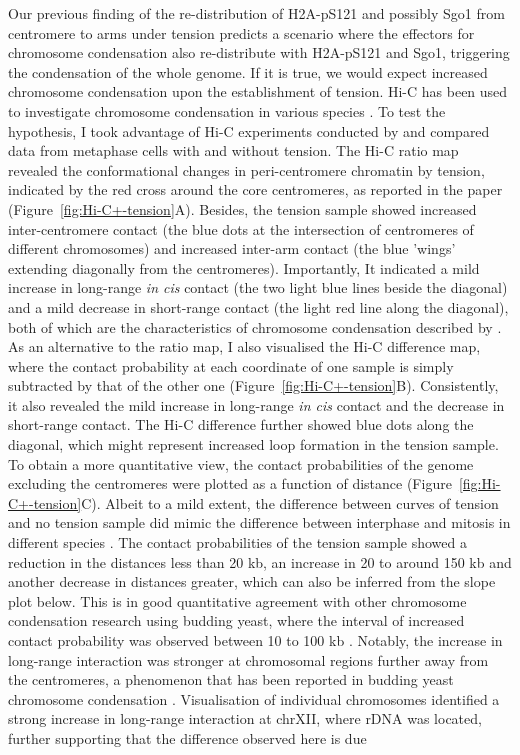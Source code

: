 Our previous finding of the re-distribution of H2A-pS121 and possibly Sgo1 from centromere to arms under tension predicts a scenario where the effectors for chromosome condensation also re-distribute with H2A-pS121 and Sgo1, triggering the condensation of the whole genome. If it is true, we would expect increased chromosome condensation upon the establishment of tension. Hi-C has been used to investigate chromosome condensation in various species \citep{Kakui2017Condensin-mediatedYeast, Schalbetter2017SMCContext, Lazar-Stefanita2017CohesinsCellcycle, Naumova2013OrganizationChromosome}. To test the hypothesis, I took advantage of Hi-C experiments conducted by \cite{Paldi2020ConvergentPericentromeres} and compared data from metaphase cells with and without tension. The Hi-C ratio map revealed the conformational changes in peri-centromere chromatin by tension, indicated by the red cross around the core centromeres, as reported in the paper (Figure~\ref{fig:Hi-C+-tension}A). Besides, the tension sample showed increased inter-centromere contact (the blue dots at the intersection of centromeres of different chromosomes) and increased inter-arm contact (the blue 'wings' extending diagonally from the centromeres). Importantly, It indicated a mild increase in long-range \textit{in cis} contact (the two light blue lines beside the diagonal) and a mild decrease in short-range contact (the light red line along the diagonal), both of which are the characteristics of chromosome condensation described by \cite{Kakui2018SMCLandscape}. As an alternative to the ratio map, I also visualised the Hi-C difference map, where the contact probability at each coordinate of one sample is simply subtracted by that of the other one (Figure~\ref{fig:Hi-C+-tension}B). Consistently, it also revealed the mild increase in long-range \textit{in cis} contact and the decrease in short-range contact. The Hi-C difference further showed blue dots along the diagonal, which might represent increased loop formation in the tension sample. To obtain a more quantitative view, the contact probabilities of the genome excluding the centromeres were plotted as a function of distance (Figure~\ref{fig:Hi-C+-tension}C). Albeit to a mild extent, the difference between curves of tension and no tension sample did mimic the difference between interphase and mitosis in different species \citep{Kakui2018SMCLandscape}. The contact probabilities of the tension sample showed a reduction in the distances less than 20 kb, an increase in 20 to around 150 kb and another decrease in distances greater, which can also be inferred from the slope plot below. This is in good quantitative agreement with other chromosome condensation research using budding yeast, where the interval of increased contact probability was observed between 10 to 100 kb \citep{Kakui2018SMCLandscape, Schalbetter2017SMCContext, Lazar-Stefanita2017CohesinsCellcycle}. Notably, the increase in long-range interaction was stronger at chromosomal regions further away from the centromeres, a phenomenon that has been reported in budding yeast chromosome condensation \citep{Neurohr2011ALength}. Visualisation of individual chromosomes identified a strong increase in long-range interaction at chrXII, where rDNA was located, further supporting that the difference observed here is due 